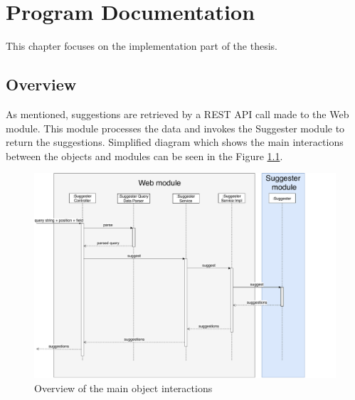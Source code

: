 \chapter{Program Documentation}
\label{chap:program}

This chapter focuses on the implementation part of the thesis.

\section{Overview}
As mentioned, suggestions are retrieved by a REST API call made to the Web module. This module processes the data and
invokes the Suggester module to return the suggestions. Simplified diagram which shows the main interactions between the
objects and modules can be seen in the Figure \ref{programmer_sequence}.
\begin{figure}[htbp]
    \centering
    \includegraphics[width=145mm]{../img/programmer_sequence.pdf}
    \caption{Overview of the main object interactions}
    \label{programmer_sequence}
\end{figure}

